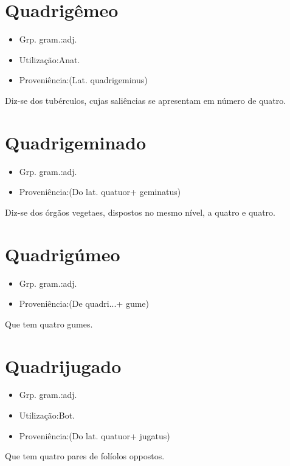 \section{Quadrigêmeo}
\begin{itemize}
\item {Grp. gram.:adj.}
\end{itemize}
\begin{itemize}
\item {Utilização:Anat.}
\end{itemize}
\begin{itemize}
\item {Proveniência:(Lat. \textunderscore quadrigeminus\textunderscore )}
\end{itemize}
Diz-se dos tubérculos, cujas saliências se apresentam em número de quatro.
\section{Quadrigeminado}
\begin{itemize}
\item {Grp. gram.:adj.}
\end{itemize}
\begin{itemize}
\item {Proveniência:(Do lat. \textunderscore quatuor\textunderscore  + \textunderscore geminatus\textunderscore )}
\end{itemize}
Diz-se dos órgãos vegetaes, dispostos no mesmo nível, a quatro e quatro.
\section{Quadrigúmeo}
\begin{itemize}
\item {Grp. gram.:adj.}
\end{itemize}
\begin{itemize}
\item {Proveniência:(De \textunderscore quadri...\textunderscore  + \textunderscore gume\textunderscore )}
\end{itemize}
Que tem quatro gumes.
\section{Quadrijugado}
\begin{itemize}
\item {Grp. gram.:adj.}
\end{itemize}
\begin{itemize}
\item {Utilização:Bot.}
\end{itemize}
\begin{itemize}
\item {Proveniência:(Do lat. \textunderscore quatuor\textunderscore  + \textunderscore jugatus\textunderscore )}
\end{itemize}
Que tem quatro pares de folíolos oppostos.
